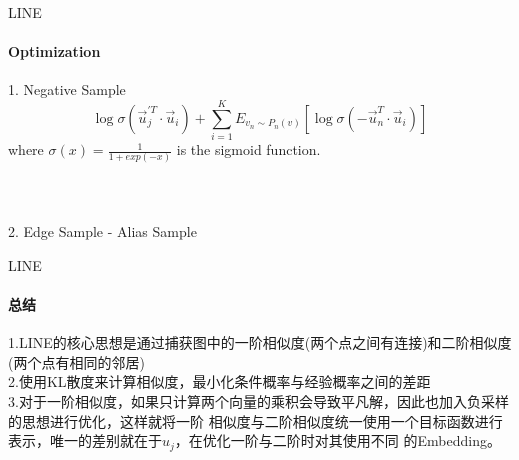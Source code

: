 \documentclass{beamer}
\begin{document}
\begin{frame}{LINE}
    \framesubtitle{Optimization}
    1. Negative Sample
    $$
    \log \sigma\left(\vec{u}_{j}^{\prime T} \cdot \vec{u}_{i}\right)+\sum_{i=1}^{K} E_{v_{n} \sim P_{n}(v)}\left[\log \sigma\left(-\vec{u}_{n}^{T} \cdot \vec{u}_{i}\right)\right]
    $$
    where $\sigma (x) = \frac{1}{1 + exp(−x)}$ is the sigmoid function.\\
    \hspace*{\fill}\\ 
    \hspace*{\fill}\\ 
    \hspace*{\fill}\\
    2. Edge Sample - Alias Sample
\end{frame}
\begin{frame}{LINE}
    \framesubtitle{总结}
    1.LINE的核心思想是通过捕获图中的一阶相似度(两个点之间有连接)和二阶相似度(两个点有相同的邻居)\\
    2.使用KL散度来计算相似度，最小化条件概率与经验概率之间的差距\\
    3.对于一阶相似度，如果只计算两个向量的乘积会导致平凡解，因此也加入负采样的思想进行优化，这样就将一阶
    相似度与二阶相似度统一使用一个目标函数进行表示，唯一的差别就在于$u_j$，在优化一阶与二阶时对其使用不同
    的Embedding。
\end{frame}
\end{document}
